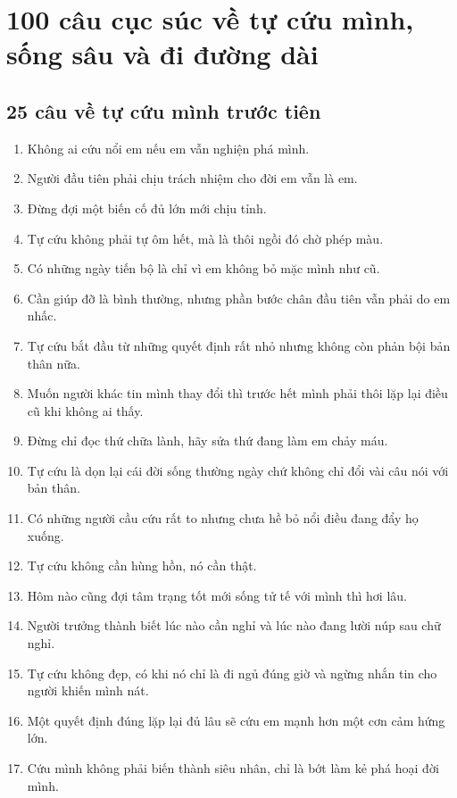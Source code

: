 \chapter{100 câu cục súc về tự cứu mình, sống sâu và đi đường dài}

\section{25 câu về tự cứu mình trước tiên}
\begin{enumerate}[leftmargin=*]
\item Không ai cứu nổi em nếu em vẫn nghiện phá mình.
\item Người đầu tiên phải chịu trách nhiệm cho đời em vẫn là em.
\item Đừng đợi một biến cố đủ lớn mới chịu tỉnh.
\item Tự cứu không phải tự ôm hết, mà là thôi ngồi đó chờ phép màu.
\item Có những ngày tiến bộ là chỉ vì em không bỏ mặc mình như cũ.
\item Cần giúp đỡ là bình thường, nhưng phần bước chân đầu tiên vẫn phải do em nhấc.
\item Tự cứu bắt đầu từ những quyết định rất nhỏ nhưng không còn phản bội bản thân nữa.
\item Muốn người khác tin mình thay đổi thì trước hết mình phải thôi lặp lại điều cũ khi không ai thấy.
\item Đừng chỉ đọc thứ chữa lành, hãy sửa thứ đang làm em chảy máu.
\item Tự cứu là dọn lại cái đời sống thường ngày chứ không chỉ đổi vài câu nói với bản thân.
\item Có những người cầu cứu rất to nhưng chưa hề bỏ nổi điều đang đẩy họ xuống.
\item Tự cứu không cần hùng hồn, nó cần thật.
\item Hôm nào cũng đợi tâm trạng tốt mới sống tử tế với mình thì hơi lâu.
\item Người trưởng thành biết lúc nào cần nghỉ và lúc nào đang lười núp sau chữ nghỉ.
\item Tự cứu không đẹp, có khi nó chỉ là đi ngủ đúng giờ và ngừng nhắn tin cho người khiến mình nát.
\item Một quyết định đúng lặp lại đủ lâu sẽ cứu em mạnh hơn một cơn cảm hứng lớn.
\item Cứu mình không phải biến thành siêu nhân, chỉ là bớt làm kẻ phá hoại đời mình.

\end{enumerate}
